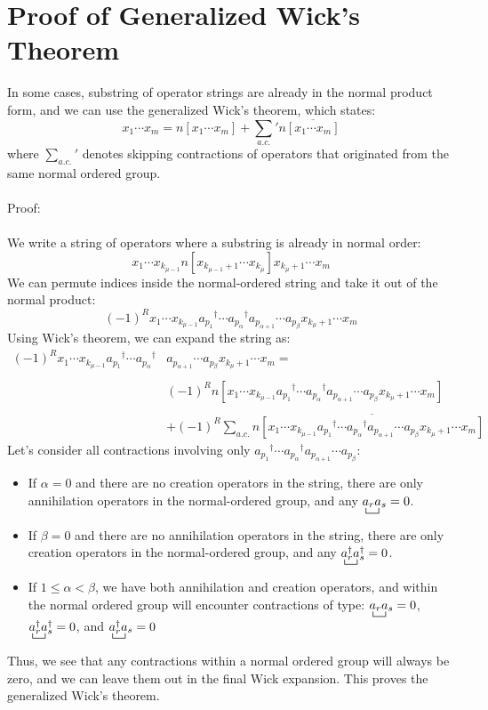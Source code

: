 \documentclass{article}
\newcommand{\ol}{\overline}
\newcommand{\ctr}{\bcontraction}
\newcommand{\dg}{\ensuremath{^\dagger} }
\newcommand{\cd}{\ensuremath{\cdots} }
\begin{document}
\section{Proof of Generalized Wick's Theorem}
In some cases, substring of operator strings are already in the normal product form, and we can use the generalized Wick's theorem, which states: 
$$x_1 \cd x_m = n[x_1 \cd x_m ]  + \sum_{a.c.} {}' n\ol{[x_1 \cd x_m ]} $$
where $\sum_{a.c.} {}' $ denotes skipping contractions of operators that originated from the same normal ordered group. 
\\ \\
Proof: \\ 
\\
We write a string of operators where a substring is already in normal order:
\[x_1 \cd x_{k_{\mu-1}} n[x_{k_{\mu-1}+1} \cd x_{k_\mu}] x_{k_\mu+1} \cd x_m\]
We can permute indices inside the normal-ordered string and take it out of the normal product:   
\[(-1)^R x_1 \cd x_{k_{\mu-1}} a_{p_1}\dg \cd a_{p_\alpha}\dg a_{p_{\alpha + 1}} \cd a_{p_{\beta}} x_{k_\mu+1} \cd x_m\]
Using Wick's theorem, we can expand the string as: 
\begin{align*} 
(-1)^R x_1 \cd x_{k_{\mu-1}} a_{p_1}\dg \cd a_{p_\alpha}\dg & a_{p_{\alpha + 1}} \cd a_{p_{\beta}} x_{k_\mu+1} \cd x_m  = \\ \\
& (-1)^R n[x_1 \cd x_{k_{\mu-1}} a_{p_1}\dg \cd a_{p_\alpha}\dg  a_{p_{\alpha + 1}} \cd a_{p_{\beta}} x_{k_\mu+1} \cd x_m] \\ \\
&+ (-1)^R \sum_{a.c.} n\ol{[x_1 \cd x_{k_{\mu-1}} a_{p_1}\dg \cd a_{p_\alpha}\dg  a_{p_{\alpha + 1}} \cd a_{p_{\beta}} x_{k_\mu+1} \cd x_m] }
\end{align*}
\newpage
\noindent
Let's consider all contractions involving only $a_{p_1}\dg \cd a_{p_\alpha}\dg  a_{p_{\alpha + 1}} \cd a_{p_{\beta}}$:
\begin{itemize}
\item If $\alpha = 0$ and there are no creation operators in the string, there are only annihilation operators in the normal-ordered group,
and any $\ctr{}{a}{{}_r}{a} a_ra_s = 0$. 
\item  If $\beta = 0$ and there are no annihilation operators in the string, there are only creation operators in the normal-ordered group,
and any $\ctr{}{a}{{}_r\dg}{a} a_r\dg a_s\dg = 0$. 
\item If $1 \leq \alpha < \beta$, we have both annihilation and creation operators, and within the normal ordered group will encounter contractions of type: 
$\ctr{}{a}{{}_r}{a} a_ra_s = 0$, $\ctr{}{a}{{}_r\dg}{a} a_r\dg a_s\dg = 0$, and $\ctr{}{a}{{}_r\dg}{a} a_r\dg a_s = 0$
\end{itemize}
Thus, we see that any contractions within a normal ordered group will always be zero, and we can leave them out in the final Wick expansion.
This proves the generalized Wick's theorem. 
\end{document}
